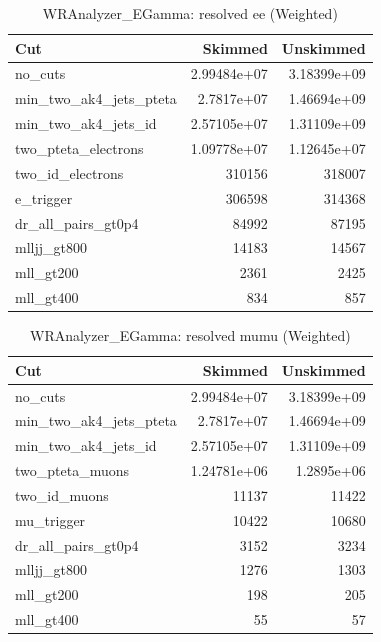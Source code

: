 \documentclass{article}
\begin{document}
\begin{table}[htbp]
\centering
\caption{WRAnalyzer\_EGamma: resolved ee (Weighted)}
\begin{tabular}{lrr}
\hline
Cut & Skimmed & Unskimmed \\
\hline
no\_cuts & 2.99484e+07 & 3.18399e+09 \\
min\_two\_ak4\_jets\_pteta & 2.7817e+07 & 1.46694e+09 \\
min\_two\_ak4\_jets\_id & 2.57105e+07 & 1.31109e+09 \\
two\_pteta\_electrons & 1.09778e+07 & 1.12645e+07 \\
two\_id\_electrons & 310156 & 318007 \\
e\_trigger & 306598 & 314368 \\
dr\_all\_pairs\_gt0p4 & 84992 & 87195 \\
mlljj\_gt800 & 14183 & 14567 \\
mll\_gt200 & 2361 & 2425 \\
mll\_gt400 & 834 & 857 \\
\hline
\end{tabular}
\end{table}

\begin{table}[htbp]
\centering
\caption{WRAnalyzer\_EGamma: resolved mumu (Weighted)}
\begin{tabular}{lrr}
\hline
Cut & Skimmed & Unskimmed \\
\hline
no\_cuts & 2.99484e+07 & 3.18399e+09 \\
min\_two\_ak4\_jets\_pteta & 2.7817e+07 & 1.46694e+09 \\
min\_two\_ak4\_jets\_id & 2.57105e+07 & 1.31109e+09 \\
two\_pteta\_muons & 1.24781e+06 & 1.2895e+06 \\
two\_id\_muons & 11137 & 11422 \\
mu\_trigger & 10422 & 10680 \\
dr\_all\_pairs\_gt0p4 & 3152 & 3234 \\
mlljj\_gt800 & 1276 & 1303 \\
mll\_gt200 & 198 & 205 \\
mll\_gt400 & 55 & 57 \\
\hline
\end{tabular}
\end{table}
\end{document}
